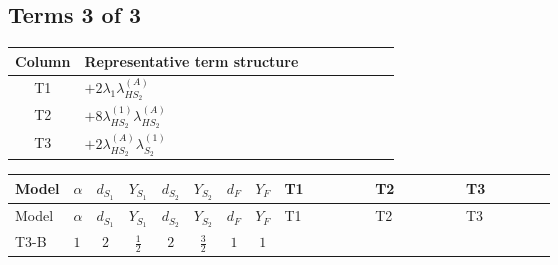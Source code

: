 \documentclass[8pt]{article}
\begin{document}
\begin{landscape}
\subsection*{Terms 3 of 3}
\begin{center}
\begin{tabular}{@{}c >{\raggedright\arraybackslash}p{0.82\linewidth}@{}}
\toprule
Column & Representative term structure \\
\midrule
T1 & \(\displaystyle +2 {\lambda_1} {\lambda_{HS_2}^{(A)}}\) \\
\midrule
T2 & \(\displaystyle +8 {\lambda_{HS_2}^{(1)}} {\lambda_{HS_2}^{(A)}}\) \\
\midrule
T3 & \(\displaystyle +2 {\lambda_{HS_2}^{(A)}} {\lambda_{S_2}^{(1)}}\) \\
\midrule
\bottomrule
\end{tabular}
\end{center}
\smallskip
\tiny
\begin{longtable}{@{}llcccccc >{\raggedright\arraybackslash}p{0.21\linewidth} >{\raggedright\arraybackslash}p{0.21\linewidth} >{\raggedright\arraybackslash}p{0.21\linewidth}@{}}
\toprule
Model & $\alpha$ & $d_{S_1}$ & $Y_{S_1}$ & $d_{S_2}$ & $Y_{S_2}$ & $d_F$ & $Y_F$ & T1 & T2 & T3 \\
\midrule
\endfirsthead
\toprule
Model & $\alpha$ & $d_{S_1}$ & $Y_{S_1}$ & $d_{S_2}$ & $Y_{S_2}$ & $d_F$ & $Y_F$ & T1 & T2 & T3 \\
\midrule
\endhead
T3-B & $1$ & $2$ & $\frac{1}{2}$ & $2$ & $\frac{3}{2}$ & $1$ & $1$ & \scriptsize\adjustbox{max width=\linewidth}{$\begin{gathered} +2 {\lambda_1} {\lambda_{HS_2}^{(A)}}\end{gathered}$} & \scriptsize\adjustbox{max width=\linewidth}{$\begin{gathered} +8 {\lambda_{HS_2}^{(1)}} {\lambda_{HS_2}^{(A)}}\end{gathered}$} & \scriptsize\adjustbox{max width=\linewidth}{$\begin{gathered} +2 {\lambda_{HS_2}^{(A)}} {\lambda_{S_2}^{(1)}}\end{gathered}$} \\
\midrule
\bottomrule
\end{longtable}
\end{landscape}
\end{document}
